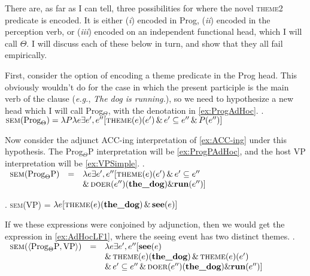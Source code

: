 \documentclass[MilwayThesis]{subfiles}
\begin{document}
There are, as far as I can tell, three possibilities for where the novel \textsc{theme2} predicate is encoded.
It is either (\textit{i}) encoded in Prog, (\textit{ii}) encoded in the perception verb, or (\textit{iii}) encoded on an independent functional head, which I will call $\Theta$.
I will discuss each of these below in turn, and show that they all fail empirically.

First, consider the option of encoding a theme predicate in the Prog head.
This obviously wouldn't do for the case in which the present participle is the main verb of the clause (\textit{e.g.}, \textit{The dog is running.}), so we need to hypothesize a new head which I will call Prog$_{\Theta}$, with the denotation in \cref{ex:ProgAdHoc}.
\ex.\label{ex:ProgAdHoc} $\textsc{sem}(\text{Prog}_{\Theta}) = \lambda P \lambda e \exists e^{\prime},e^{\prime\prime}[\textsc{theme}(e)(e^{\prime}) \,\&\, e^{\prime}\subseteq e^{\prime\prime} \,\&\, P(e^{\prime\prime})]$

Now consider the adjunct ACC-ing interpretation of \cref{ex:ACC-ing} under this hypothesis.
The Prog$_{\Theta}$P interpretation will be \cref{ex:ProgPAdHoc}, and the host VP interpretation will be \cref{ex:VPSimple}.
\ex.\label{ex:ProgPAdHoc} $
\begin{array}[t]{rcl}
	\textsc{sem}(\text{Prog}_{\Theta}\text{P}) &=& \lambda e \exists e^{\prime},e^{\prime\prime}[\textsc{theme}(e)(e^{\prime}) \,\&\, e^{\prime}\subseteq e^{\prime\prime}\\
	& & \&\, \textsc{doer}(e^{\prime\prime})(\textbf{the\_dog}) \& \textbf{run}(e^{\prime\prime})]
\end{array}
$

\ex.\label{ex:VPSimple} \textsc{sem}(VP) = $\lambda e [\textsc{theme}(e)(\textbf{the\_dog}) \,\&\, \textbf{see}(e)]$

If we these expressions were conjoined by adjunction, then we would get the expression in \cref{ex:AdHocLF1}, where the seeing event has two distinct themes.
\ex.\label{ex:AdHocLF1} $
\begin{array}[t]{rcl}
	\textsc{sem}(\langle \text{Prog}_{\Theta}\text{P}, \text{VP}\rangle) &=& \lambda e\exists e^{\prime},e^{\prime\prime}[\textbf{see}(e)\\
		& & \&\, \textsc{theme}(e)(\textbf{the\_dog}) \,\&\, \textsc{theme}(e)(e^{\prime})\\
	& & \&\, e^{\prime}\subseteq e^{\prime\prime} \,\&\, \textsc{doer}(e^{\prime\prime})(\textbf{the\_dog}) \& \textbf{run}(e^{\prime\prime})]
\end{array}
$
\end{document}
